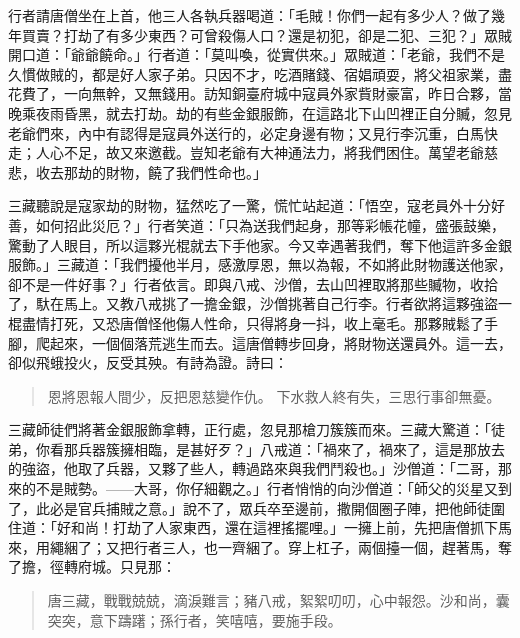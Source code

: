 行者請唐僧坐在上首，他三人各執兵器喝道：「毛賊！你們一起有多少人？做了幾年買賣？打劫了有多少東西？可曾殺傷人口？還是初犯，卻是二犯、三犯？」眾賊開口道：「爺爺饒命。」行者道：「莫叫喚，從實供來。」眾賊道：「老爺，我們不是久慣做賊的，都是好人家子弟。只因不才，吃酒賭錢、宿娼頑耍，將父祖家業，盡花費了，一向無幹，又無錢用。訪知銅臺府城中寇員外家貲財豪富，昨日合夥，當晚乘夜雨昏黑，就去打劫。劫的有些金銀服飾，在這路北下山凹裡正自分贓，忽見老爺們來，內中有認得是寇員外送行的，必定身邊有物；又見行李沉重，白馬快走；人心不足，故又來邀截。豈知老爺有大神通法力，將我們困住。萬望老爺慈悲，收去那劫的財物，饒了我們性命也。」

三藏聽說是寇家劫的財物，猛然吃了一驚，慌忙站起道：「悟空，寇老員外十分好善，如何招此災厄？」行者笑道：「只為送我們起身，那等彩帳花幢，盛張鼓樂，驚動了人眼目，所以這夥光棍就去下手他家。今又幸遇著我們，奪下他這許多金銀服飾。」三藏道：「我們擾他半月，感激厚恩，無以為報，不如將此財物護送他家，卻不是一件好事？」行者依言。即與八戒、沙僧，去山凹裡取將那些贓物，收拾了，馱在馬上。又教八戒挑了一擔金銀，沙僧挑著自己行李。行者欲將這夥強盜一棍盡情打死，又恐唐僧怪他傷人性命，只得將身一抖，收上毫毛。那夥賊鬆了手腳，爬起來，一個個落荒逃生而去。這唐僧轉步回身，將財物送還員外。這一去，卻似飛蛾投火，反受其殃。有詩為證。詩曰：
\begin{quote}
恩將恩報人間少，反把恩慈變作仇。
下水救人終有失，三思行事卻無憂。
\end{quote}

三藏師徒們將著金銀服飾拿轉，正行處，忽見那槍刀簇簇而來。三藏大驚道：「徒弟，你看那兵器簇擁相臨，是甚好歹？」八戒道：「禍來了，禍來了，這是那放去的強盜，他取了兵器，又夥了些人，轉過路來與我們鬥殺也。」沙僧道：「二哥，那來的不是賊勢。——大哥，你仔細觀之。」行者悄悄的向沙僧道：「師父的災星又到了，此必是官兵捕賊之意。」說不了，眾兵卒至邊前，撒開個圈子陣，把他師徒圍住道：「好和尚！打劫了人家東西，還在這裡搖擺哩。」一擁上前，先把唐僧抓下馬來，用繩綑了；又把行者三人，也一齊綑了。穿上杠子，兩個擡一個，趕著馬，奪了擔，徑轉府城。只見那：
\begin{quote}
唐三藏，戰戰兢兢，滴淚難言；豬八戒，絮絮叨叨，心中報怨。沙和尚，囊突突，意下躊躇；孫行者，笑嘻嘻，要施手段。
\end{quote}

